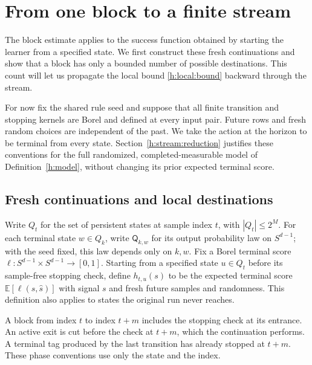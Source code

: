 \section{From one block to a finite stream}\label{h:stream:section}

The block estimate applies to the success function obtained by starting
the learner from a specified state. We first construct these fresh
continuations and show that a block has only a bounded number of possible
destinations. This count will let us propagate the local bound
\eqref{h:local:bound} backward through the stream.

For now fix the shared rule seed and suppose that all finite transition
and stopping kernels are Borel and defined at every input pair. Future
rows and fresh random choices are independent of the past. We take the
action at the horizon to be terminal from every state.
Section~\ref{h:stream:reduction} justifies these conventions for the full randomized,
completed-measurable model of Definition~\ref{h:model}, without changing
its prior expected terminal score.

\subsection{Fresh continuations and local destinations}

Write $Q_t$ for the set of persistent states at sample index $t$, with
$|Q_t|\le2^M$. For each terminal state $w\in Q_k$, write
$\mathsf Q_{k,w}$ for its output probability law on $S^{d-1}$;
with the seed fixed, this law depends only on $k,w$.
Fix a Borel terminal score
$\ell:S^{d-1}\times S^{d-1}\to[0,1]$. Starting from a specified
state $u\in Q_t$ before its sample-free stopping check, define
$h_{t,u}(s)$ to be the expected terminal score
$\mathbb E[\ell(s,\widehat s)]$ with signal $s$ and fresh future
samples and randomness. This definition also applies to states the
original run never reaches.

A block from index $t$ to index $t+m$ includes the stopping check at
its entrance. An active exit is cut before the check at $t+m$, which
the continuation performs. A terminal tag produced by the last
transition has already stopped at $t+m$. These phase conventions use
only the state and the index.


